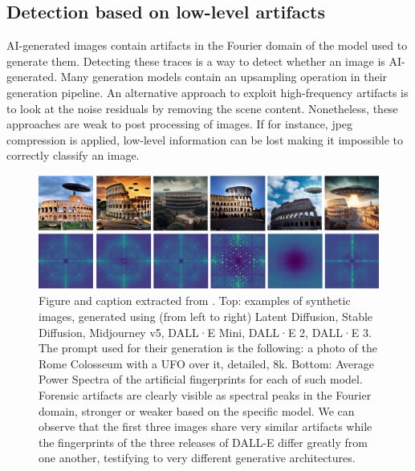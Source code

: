 \documentclass[12pt,a4paper]{article}
\begin{document}
\subsection{Detection based on low-level artifacts}
AI-generated images contain artifacts in the Fourier domain of the model used to generate them. Detecting these traces is a way to detect whether an image is AI-generated. Many generation models contain an upsampling operation in their generation pipeline. An alternative approach to exploit high-frequency artifacts is to look at the noise residuals by removing the scene content. Nonetheless, these approaches are weak to post processing of images. If for instance, jpeg compression is applied, low-level information can be lost making it impossible to correctly classify an image.
\begin{figure}[H]
    \includegraphics[width=\textwidth]{img/peaks.png}
    \caption{Figure and caption extracted from \autocite*{tariangSyntheticImageVerification2024}. Top: examples of synthetic images, generated using (from left to right) Latent Diffusion, Stable Diffusion, Midjourney v5, DALL·E Mini, DALL·E 2, DALL·E 3. The prompt used for their generation is the following: a photo of the Rome Colosseum with a UFO over it, detailed, 8k. Bottom: Average Power Spectra of the artificial fingerprints for each of such model. Forensic artifacts are clearly visible as spectral peaks in the Fourier domain, stronger or weaker based on the specific model. We can observe that the first three images share very similar artifacts while the fingerprints of the three releases of DALL-E differ greatly from one another, testifying to very different generative architectures.}
\end{figure}
\end{document}
